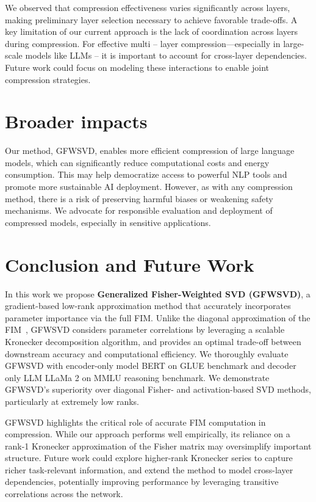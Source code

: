 \documentclass{article}
\begin{document}
We observed that compression effectiveness varies significantly across layers, making preliminary layer selection necessary to achieve favorable trade-offs. A key limitation of our current approach is the lack of coordination across layers during compression. For effective multi -- layer compression—especially in large-scale models like LLMs -- it is important to account for cross-layer dependencies. Future work could focus on modeling these interactions to enable joint compression strategies.

\section{Broader impacts}
\label{sec:border_impact}

Our method, GFWSVD, enables more efficient compression of large language models, which can significantly reduce computational costs and energy consumption. This may help democratize access to powerful NLP tools and promote more sustainable AI deployment. However, as with any compression method, there is a risk of preserving harmful biases or weakening safety mechanisms. We advocate for responsible evaluation and deployment of compressed models, especially in sensitive applications.


\section{Conclusion and Future Work}

In this work we propose \textbf{Generalized Fisher-Weighted SVD (GFWSVD)}, a gradient-based low-rank approximation method that accurately incorporates parameter importance via the full FIM. Unlike the diagonal approximation of the FIM~\cite{FWSVD}, GFWSVD considers parameter correlations by leveraging a scalable Kronecker decomposition algorithm, and provides an optimal trade-off between downstream accuracy and computational efficiency. We thoroughly evaluate GFWSVD with encoder-only model BERT on GLUE benchmark and decoder only LLM LLaMa 2 on MMLU reasoning benchmark. We demonstrate GFWSVD’s superiority over diagonal Fisher- and activation-based SVD methods, particularly at extremely low ranks.

GFWSVD highlights the critical role of accurate FIM computation in compression. While our approach performs well empirically, its reliance on a rank-1 Kronecker approximation of the Fisher matrix may oversimplify important structure. Future work could explore higher-rank Kronecker series to capture richer task-relevant information, and extend the method to model cross-layer dependencies, potentially improving performance by leveraging transitive correlations across the network.
\end{document}
